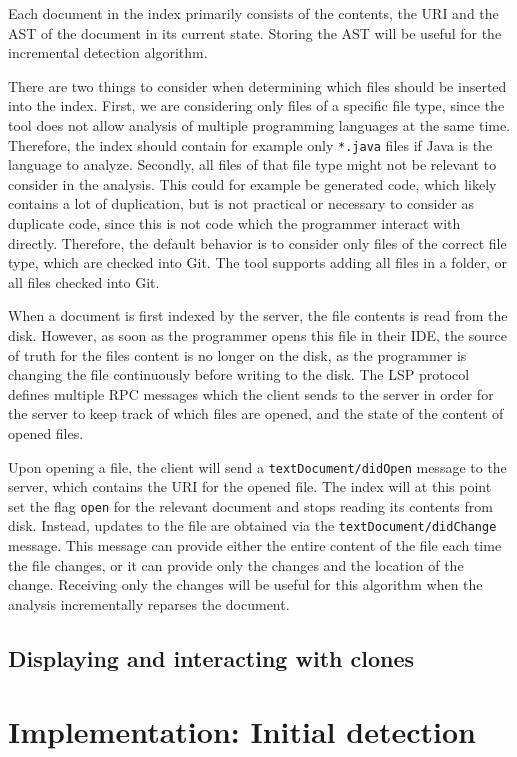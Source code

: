Each document in the index primarily consists of the contents, the URI and the AST of the
document in its current state. Storing the AST will be useful for the incremental
detection algorithm.

There are two things to consider when determining which files should be inserted into the
index. First, we are considering only files of a specific file type, since the tool does
not allow analysis of multiple programming languages at the same time. Therefore, the
index should contain for example only \verb|*.java| files if Java is the language to
analyze. Secondly, all files of that file type might not be relevant to consider in the
analysis. This could for example be generated code, which likely contains a lot of
duplication, but is not practical or necessary to consider as duplicate code, since this
is not code which the programmer interact with directly. Therefore, the default behavior
is to consider only files of the correct file type, which are checked into Git. The tool
supports adding all files in a folder, or all files checked into Git.

When a document is first indexed by the server, the file contents is read from the disk.
However, as soon as the programmer opens this file in their IDE, the source of truth for
the files content is no longer on the disk, as the programmer is changing the file
continuously before writing to the disk. The LSP protocol defines multiple RPC
messages which the client sends to the server in order for the server to keep track of
which files are opened, and the state of the content of opened files.

Upon opening a file, the client will send a \verb|textDocument/didOpen| message to the
server, which contains the URI for the opened file. The index will at this point set the
flag \verb|open| for the relevant document and stops reading its contents from disk.
Instead, updates to the file are obtained via the \verb|textDocument/didChange| message.
This message can provide either the entire content of the file each time the file changes,
or it can provide only the changes and the location of the change. Receiving only the
changes will be useful for this algorithm when the analysis incrementally reparses the
document.

\section{Displaying and interacting with clones}

\chapter{Implementation: Initial detection}


